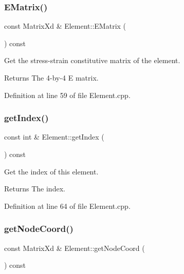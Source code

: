 \subsubsection{\texorpdfstring{E\+Matrix()}{EMatrix()}}
{\footnotesize\ttfamily const Matrix\+Xd \& Element\+::\+E\+Matrix (\begin{DoxyParamCaption}{ }\end{DoxyParamCaption}) const}



Get the stress-\/strain constitutive matrix of the element. 

\begin{DoxyReturn}{Returns}
The 4-\/by-\/4 E matrix. 
\end{DoxyReturn}


Definition at line 59 of file Element.\+cpp.

\mbox{\label{class_element_a85dc312253f1d39c29659393fbb1d485}} 
\subsubsection{\texorpdfstring{get\+Index()}{getIndex()}}
{\footnotesize\ttfamily const int \& Element\+::get\+Index (\begin{DoxyParamCaption}{ }\end{DoxyParamCaption}) const}



Get the index of this element. 

\begin{DoxyReturn}{Returns}
The index. 
\end{DoxyReturn}


Definition at line 64 of file Element.\+cpp.

\mbox{\label{class_element_a4d12b24e62592a1456e04d15872d5240}} 
\subsubsection{\texorpdfstring{get\+Node\+Coord()}{getNodeCoord()}}
{\footnotesize\ttfamily const Matrix\+Xd \& Element\+::get\+Node\+Coord (\begin{DoxyParamCaption}{ }\end{DoxyParamCaption}) const}



